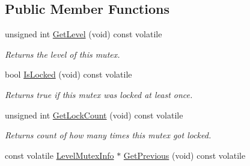 \subsection*{Public Member Functions}
\begin{DoxyCompactItemize}
\item 
\hypertarget{classLoki_1_1LevelMutexInfo_abdedfcacd393739737f1792cdf5a1c85}{}unsigned int \hyperlink{classLoki_1_1LevelMutexInfo_abdedfcacd393739737f1792cdf5a1c85}{Get\+Level} (void) const  volatile\label{classLoki_1_1LevelMutexInfo_abdedfcacd393739737f1792cdf5a1c85}

\begin{DoxyCompactList}\small\item\em Returns the level of this mutex. \end{DoxyCompactList}\item 
\hypertarget{classLoki_1_1LevelMutexInfo_a579b8448224912bb4d666ac8e0590541}{}bool \hyperlink{classLoki_1_1LevelMutexInfo_a579b8448224912bb4d666ac8e0590541}{Is\+Locked} (void) const  volatile\label{classLoki_1_1LevelMutexInfo_a579b8448224912bb4d666ac8e0590541}

\begin{DoxyCompactList}\small\item\em Returns true if this mutex was locked at least once. \end{DoxyCompactList}\item 
\hypertarget{classLoki_1_1LevelMutexInfo_abd8ad4b0cbc81c3875db1e1cb8c05e91}{}unsigned int \hyperlink{classLoki_1_1LevelMutexInfo_abd8ad4b0cbc81c3875db1e1cb8c05e91}{Get\+Lock\+Count} (void) const  volatile\label{classLoki_1_1LevelMutexInfo_abd8ad4b0cbc81c3875db1e1cb8c05e91}

\begin{DoxyCompactList}\small\item\em Returns count of how many times this mutex got locked. \end{DoxyCompactList}\item 
\hypertarget{classLoki_1_1LevelMutexInfo_a73937a31d5902e74752708c3b2917327}{}const volatile \hyperlink{classLoki_1_1LevelMutexInfo}{Level\+Mutex\+Info} $\ast$ \hyperlink{classLoki_1_1LevelMutexInfo_a73937a31d5902e74752708c3b2917327}{Get\+Previous} (void) const  volatile\label{classLoki_1_1LevelMutexInfo_a73937a31d5902e74752708c3b2917327}


\end{DoxyCompactItemize}
